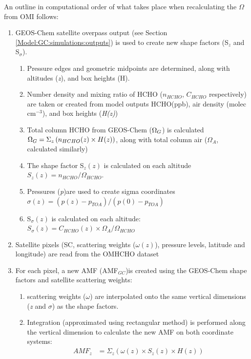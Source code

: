     An outline in computational order of what takes place when recalculating the $\Omega$ from OMI follows:
    \begin{enumerate}
      \item GEOS-Chem satellite overpass output (see Section \ref{Model:GC:simulations:outputs}) is used to create new shape factors (S$_z$ and S$_\sigma$).
      \begin{enumerate}
        \item Pressure edges and geometric midpoints are determined, along with altitudes (\textit{z}), and box heights (H).
        \item Number density and mixing ratio of HCHO ($n_{HCHO}$, $C_{HCHO}$ respectively) are taken or created from model outputs HCHO(ppb), air density (molec cm$^{-3}$), and box heights (\textit{H(z)})
        \item Total column HCHO from GEOS-Chem ($\Omega_{G}$) is calculated $\Omega_{G} = \Sigma_z \left(n_{HCHO}(z) \times H(z) \right)$, along with total column air ($\Omega_{A}$, calculated similarly)
        \item The shape factor S$_z(z)$ is calculated on each altitude $S_z(z) = n_{HCHO} / \Omega_{HCHO}$.
        \item Pressures (\textit{p})are used to create sigma coordinates $\sigma(z) = (p(z) - p_{TOA}) / (p(0)-p_{TOA})$
        \item S$_\sigma(z)$ is calculated on each altitude: $S_\sigma(z) = C_{HCHO}(z) \times \Omega_A / \Omega_{HCHO}$
      \end{enumerate}
      \item Satellite pixels (SC, scattering weights ($\omega(z)$), pressure levels, latitude and longitude) are read from the OMHCHO dataset
      \item For each pixel, a new AMF (AMF$_{GC}$)is created using the GEOS-Chem shape factors and satellite scattering weights:
      \begin{enumerate}
        \item scattering weights ($\omega$) are interpolated onto the same vertical dimensions (\textit{z} and $\sigma$) as the shape factors.
        \item Integration (approximated using rectangular method) is performed along the vertical dimension to calculate the new AMF on both coordinate systems:
        \begin{align}
          AMF_z &= \Sigma_z \left(\omega(z) \times S_z(z) \times H(z)\right) \\

\end{align}
\end{enumerate}
\end{enumerate}

